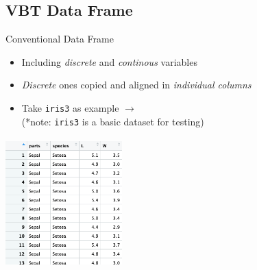 \documentclass[11pt]{beamer}
\newcommand{\code}[1]{\texttt{#1}}
\begin{document}
\subsection{VBT Data Frame}
\begin{frame}{Conventional Data Frame}
    \begin{minipage}[t]{0.5\textwidth}
        \vspace{0pt}
        \begin{itemize}
            \item Including \emph{discrete} and \emph{continous} variables
            \item \emph{\color{red}Discrete} ones copied and aligned in \emph{\color{red}individual columns}
            \item Take \code{iris3} as example $\rightarrow$ \\ {\footnotesize\color{olive}(*note: \code{iris3} is a basic dataset for testing)}
        \end{itemize}
    \end{minipage}%
    \hfill
    \begin{minipage}[t]{0.45\textwidth}
        \vspace{0pt}
        \centering
              \includegraphics[height=5cm, width=4.5cm]{Fig1.png}
    \end{minipage}
\end{frame}
\end{document}
